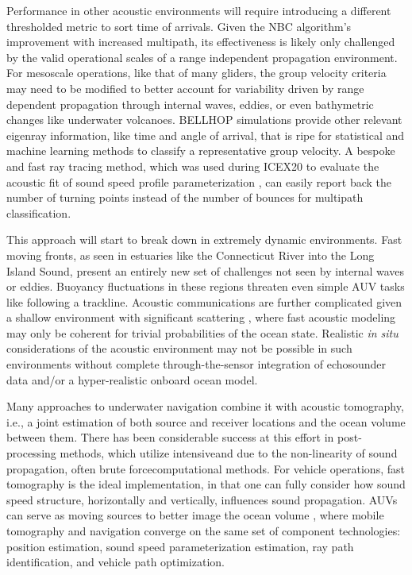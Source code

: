 Performance in other acoustic environments will require introducing a different thresholded metric to sort time of arrivals.
Given the NBC algorithm's improvement with increased multipath, its effectiveness is likely only challenged by the valid operational scales of a range independent propagation environment.
For mesoscale operations, like that of many gliders, the group velocity criteria may need to be modified to better account for variability driven by range dependent propagation through internal waves, eddies, or even bathymetric changes like underwater volcanoes.
BELLHOP simulations provide other relevant eigenray information, like time and angle of arrival, that is ripe for statistical and machine learning methods to classify a representative group velocity.
A bespoke and fast ray tracing method, which was used during ICEX20 to evaluate the acoustic fit of sound speed profile parameterization \citep{bhatt_embedded_2021}, can easily report back the number of turning points instead of the number of bounces for multipath classification.

This approach will start to break down in extremely dynamic environments.
Fast moving fronts, as seen in estuaries like the Connecticut River into the Long Island Sound, present an entirely new set of challenges not seen by internal waves or eddies.
Buoyancy fluctuations in these regions threaten even simple AUV tasks like following a trackline.
Acoustic communications are further complicated given a shallow environment with significant scattering \citep{lavery_measurements_2010,ross_acoustic_2012,lavery_broadband_2013}, where fast acoustic modeling may only be coherent for trivial probabilities of the ocean state.
Realistic \textit{in situ} considerations of the acoustic environment may not be possible in such environments without complete through-the-sensor integration of echosounder data and/or a hyper-realistic onboard ocean model.

Many approaches to underwater navigation combine it with acoustic tomography, i.e., a joint estimation of both source and receiver locations and the ocean volume between them.
There has been considerable success at this effort in post-processing methods, which utilize intensive\textemdash and due to the non-linearity of sound propagation, often brute force\textemdash computational methods. 
For vehicle operations, fast tomography is the ideal implementation, in that one can fully consider how sound speed structure, horizontally and vertically, influences sound propagation.
AUVs can serve as moving sources to better image the ocean volume \citep{deffenbaugh_optimal_1997,elisseeff_ocean_2002}, where mobile tomography and navigation converge on the same set of component technologies: position estimation, sound speed parameterization estimation, ray path identification, and vehicle path optimization.

